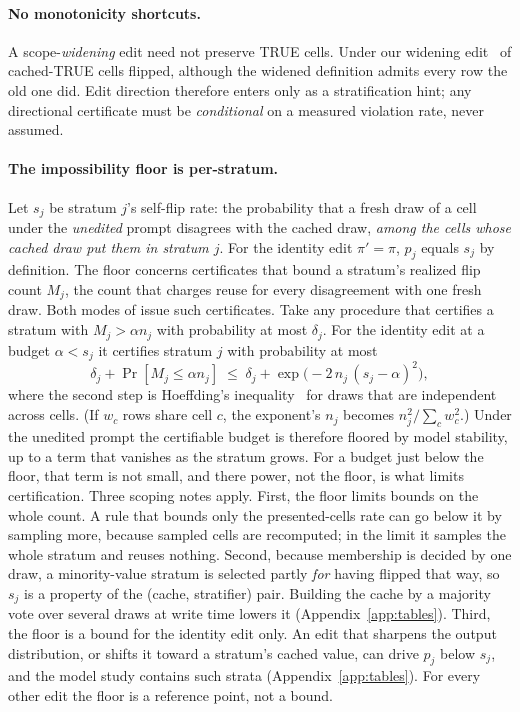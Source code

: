 \keeprunin
\paragraph{No monotonicity shortcuts.} A scope-\emph{widening} edit
need not preserve TRUE cells. Under our widening edit
\wideningTrueFlip\ of cached-TRUE cells flipped, although the widened
definition admits every row the old one did. Edit direction therefore enters \sivm{} only as a
stratification hint; any directional certificate must be
\emph{conditional} on a measured violation rate, never assumed.

\keeprunin
\paragraph{The impossibility floor is per-stratum.} Let $s_j$ be
stratum $j$'s self-flip rate: the probability that a fresh draw of a
cell under the \emph{unedited} prompt disagrees with the cached draw,
\emph{among the cells whose cached draw put them in stratum $j$}. For
the identity edit $\pi'{=}\pi$, $p_j$ equals $s_j$ by definition. The
floor concerns certificates that bound a stratum's realized flip count
$M_j$, the count that charges reuse for every disagreement with one
fresh draw. Both modes of \sivm{} issue such certificates. Take any
procedure that certifies a stratum with $M_j > \alpha n_j$ with
probability at most $\delta_j$. For the identity edit at a budget
$\alpha < s_j$ it certifies stratum $j$ with probability at most
\[
  \delta_j + \Pr[M_j \le \alpha n_j]
  \;\le\; \delta_j + \exp\!\bigl(-2\,n_j\,(s_j - \alpha)^2\bigr),
\]
where the second step is Hoeffding's inequality~\cite{hoeffding} for
draws that are independent across cells. (If $w_c$ rows share cell $c$,
the exponent's $n_j$ becomes $n_j^2/\sum_c w_c^2$.) Under the unedited
prompt the certifiable budget is therefore floored by model stability,
up to a term that vanishes as the stratum grows. For a budget just
below the floor, that term is not small, and there power, not the floor,
is what limits certification. Three scoping notes apply. First, the
floor limits bounds on the whole count. A rule that bounds only the
presented-cells rate can go below it by sampling more, because sampled
cells are recomputed; in the limit it samples the whole stratum and
reuses nothing. Second, because membership is decided by one draw, a
minority-value stratum is selected partly \emph{for} having flipped that
way, so $s_j$ is a property of the (cache, stratifier) pair.
Building the cache by a majority vote over several draws at write time
lowers it (Appendix~\ref{app:tables}).
Third, the floor is a bound for the identity edit only. An edit that
sharpens the output distribution, or shifts it toward a stratum's
cached value, can drive $p_j$ below $s_j$, and the
model study contains such strata (Appendix~\ref{app:tables}). For every
other edit the floor is a reference point, not a bound.

